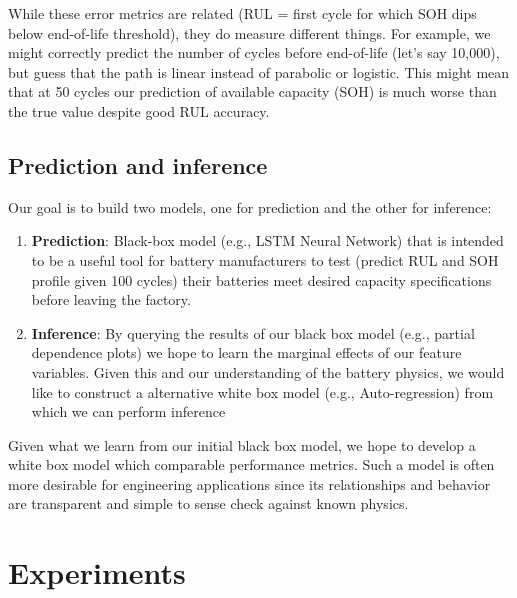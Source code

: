 \documentclass{article}
\begin{document}
While these error metrics are related (RUL = first cycle for which SOH dips below end-of-life threshold), they do measure different things. For example, we might correctly predict the number of cycles before end-of-life (let's say 10,000), but guess that the path is linear instead of parabolic or logistic. This might mean that at 50 cycles our prediction of available capacity (SOH) is much worse than the true value despite good RUL accuracy. 

\subsection{Prediction and inference}

Our goal is to build two models, one for prediction and the other for inference:
\begin{enumerate}
    \item \textbf{Prediction}: Black-box model (e.g., LSTM Neural Network) that is intended to be a useful tool for battery manufacturers to test (predict RUL and SOH profile given 100 cycles) their batteries meet desired capacity specifications before leaving the factory. 
    \item \textbf{Inference}: By querying the results of our black box model (e.g., partial dependence plots) we hope to learn the marginal effects of our feature variables. Given this and our understanding of the battery physics, we would like to construct a alternative white box model (e.g., Auto-regression) from which we can perform inference
\end{enumerate}

Given what we learn from our initial black box model, we hope to develop a white box model which comparable performance metrics. Such a model is often more desirable for engineering applications since its relationships and behavior are transparent and simple to sense check against known physics.


\section{Experiments}
 
\end{document}
